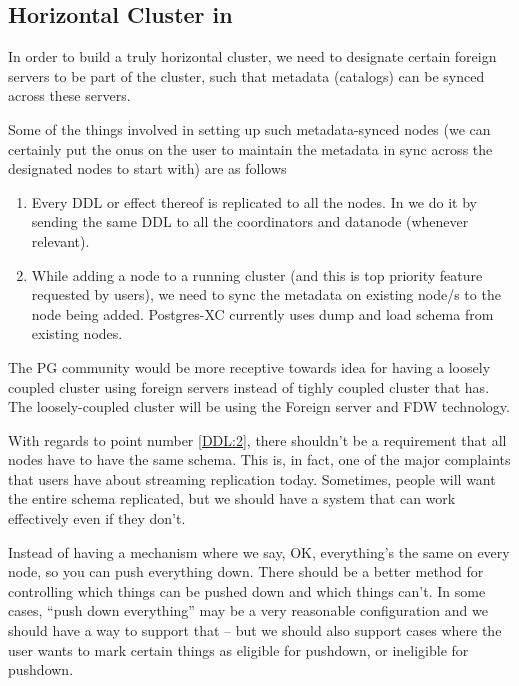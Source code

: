 
\subsection{Horizontal Cluster in \PG}

	In order to build a truly horizontal cluster, we need to designate certain foreign
	servers to be part of the cluster, such that metadata (catalogs) can be synced
	across these servers.
	
	Some of the things involved in setting up such metadata-synced nodes (we can
	certainly put the onus on the user to maintain the metadata in sync across the
	designated nodes to start with) are as follows
	
	\begin{enumerate}
		\item Every DDL or effect thereof is replicated to all the nodes.
			  In \XC{} we do it by sending the same DDL to all the coordinators and
			  datanode (whenever relevant).
		\item \label{DDL:2}While adding a node to a running cluster (and this is top priority feature
			  requested by users), we need to sync the metadata on existing node/s to
			  the node being added. Postgres-XC currently uses dump and load schema from
			  existing nodes.
	\end{enumerate}
	
	The PG community would be more receptive towards idea for having a loosely coupled
	cluster using foreign servers instead of tighly coupled cluster that \XC{} has.
	The loosely-coupled cluster will be using the Foreign server and FDW technology.
	
	With regards to point number \ref{DDL:2}, there shouldn't be a requirement that
	all nodes have to have the same schema.
	This is, in fact, one of the major complaints that users have about streaming
	replication today.
	Sometimes, people will want the entire schema replicated, but we should have a
	system that can work effectively even if they don't.  
	
	Instead of having a mechanism where we say, OK, everything's the same on every
	node, so you can push everything down.
	There should be a better method for controlling which things can be pushed
	down and which things can't.
	In some cases, ``push down everything'' may be a very reasonable configuration
	and we should have a way to support that -- but we should also support cases
	where the user wants to mark certain things as eligible for pushdown, or ineligible
	for pushdown.
	
